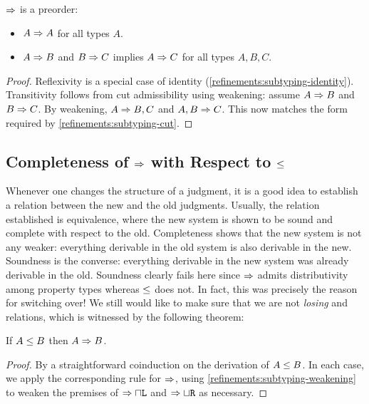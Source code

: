 \begin{corollary}
  \label{refinements:sub-is-preorder}
  $\mathrel\Rightarrow$ is a preorder:
  \begin{itemize}
    \item $A \mathrel\Rightarrow A$ for all types $A$.
    \item $A \mathrel\Rightarrow B$ and $B \mathrel\Rightarrow C$ implies $A \mathrel\Rightarrow C$ for all types $A, B, C$.
  \end{itemize}
\end{corollary}
\begin{proof}
  Reflexivity is a special case of identity (\cref{refinements:subtyping-identity}). Transitivity follows from cut admissibility using weakening: assume $A \mathrel\Rightarrow B$ and $B \mathrel\Rightarrow C$. By weakening, $A \mathrel\Rightarrow B, C$ and $A, B \mathrel\Rightarrow C$. This now matches the form required by \cref{refinements:subtyping-cut}.
\end{proof}


\subsection{Completeness of \texorpdfstring{$\mathrel\Rightarrow$}{Algorithmic Subtyping} with Respect to \texorpdfstring{$\le$}{Declarative Subtyping}}

Whenever one changes the structure of a judgment, it is a good idea to establish a relation between the new and the old judgments. Usually, the relation established is equivalence, where the new system is shown to be sound and complete with respect to the old. Completeness shows that the new system is not any weaker: everything derivable in the old system is also derivable in the new. Soundness is the converse: everything derivable in the new system was already derivable in the old. Soundness clearly fails here since $\mathrel\Rightarrow$ admits distributivity among property types whereas $\le$ does not. In fact, this was precisely the reason for switching over! We still would like to make sure that we are not \emph{losing} and relations, which is witnessed by the following theorem:

\begin{theorem}
  If $A \le B$ then $A \mathrel\Rightarrow B$.
\end{theorem}
\begin{proof}
  By a straightforward coinduction on the derivation of $A \le B$. In each case, we apply the corresponding rule for $\mathrel\Rightarrow$, using \cref{refinements:subtyping-weakening} to weaken the premises of $\mathrel\Rightarrow{\mathbin{\sqcap}\texttt{L}}$ and $\mathrel\Rightarrow{\mathbin{\sqcup}\texttt{R}}$ as necessary.
\end{proof}

